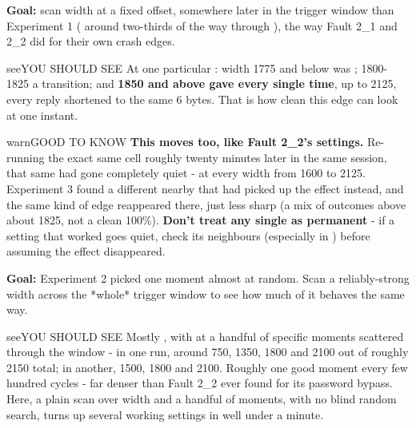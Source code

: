 \documentclass[11pt,letterpaper]{article}
\begin{document}

\textbf{Goal:} scan width at a fixed offset, somewhere later in the trigger window than Experiment 1
( around two-thirds of the way through ), the way Fault 2\_1 and 2\_2 did for
their own crash edges.

\begin{guidecallout}{see}{YOU SHOULD SEE}
At one particular : width 1775 and below was ; 1800-1825 a transition; and
\textbf{1850 and above gave  every single time}, up to 2125, every reply shortened to the same 6 bytes.
That is how clean this edge can look at one instant.
\end{guidecallout}

\begin{guidecallout}{warn}{GOOD TO KNOW}
\textbf{This moves too, like Fault 2\_2's settings.} Re-running the exact same cell roughly twenty minutes later in
the same session, that same  had gone completely quiet -  at every width from 1600 to
2125. Experiment 3 found a different  nearby that had picked up the effect instead, and the same
kind of edge reappeared there, just less sharp (a mix of outcomes above about 1825, not a clean 100\%). \textbf{Don't
treat any single  as permanent} - if a setting that worked goes quiet, check
its neighbours (especially in ) before assuming the effect disappeared.
\end{guidecallout}


\textbf{Goal:} Experiment 2 picked one moment almost at random. Scan a reliably-strong width across the *whole*
trigger window to see how much of it behaves the same way.

\begin{guidecallout}{see}{YOU SHOULD SEE}
Mostly , with  at a handful of specific moments scattered through the window - in one run,
around 750, 1350, 1800 and 2100 out of roughly 2150 total; in another, 1500, 1800 and 2100. Roughly one good moment
every few hundred cycles - far denser than Fault 2\_2 ever found for its password bypass. Here, a plain scan over
width and a handful of moments, with no blind random search, turns up several working settings in well under a minute.
\end{guidecallout}
\end{document}
